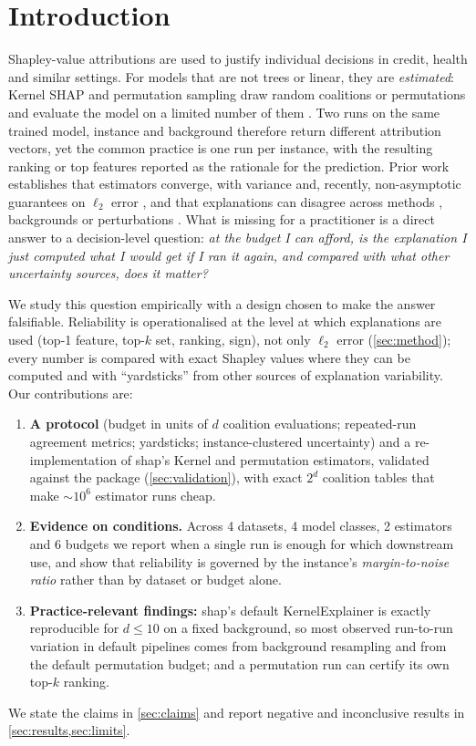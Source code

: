 \documentclass{article}
\begin{document}
\section{Introduction}
Shapley-value attributions \citep{shapley1953,lundberg2017} are used to justify individual decisions in credit, health and similar settings.
For models that are not trees or linear, they are \emph{estimated}: Kernel SHAP and permutation sampling draw random coalitions or permutations and evaluate the model on a limited number of them \citep{lundberg2017,mitchell2022,covert2021}.
Two runs on the same trained model, instance and background therefore return different attribution vectors, yet the common practice is one run per instance, with the resulting ranking or top features reported as the rationale for the prediction.
Prior work establishes that estimators converge, with variance and, recently, non-asymptotic guarantees on $\ell_2$ error \citep{covert2021,musco2024}, and that explanations can disagree across methods \citep{krishna2022}, backgrounds \citep{yuan2022} or perturbations \citep{alvarezmelis2018,ghorbani2019}.
What is missing for a practitioner is a direct answer to a decision-level question: \emph{at the budget I can afford, is the explanation I just computed what I would get if I ran it again, and compared with what other uncertainty sources, does it matter?}

We study this question empirically with a design chosen to make the answer falsifiable.
Reliability is operationalised at the level at which explanations are used (top-1 feature, top-$k$ set, ranking, sign), not only $\ell_2$ error (\cref{sec:method}); every number is compared with exact Shapley values where they can be computed and with ``yardsticks'' from other sources of explanation variability.
Our contributions are:
\begin{enumerate}
\item \textbf{A protocol} (budget in units of $d$ coalition evaluations; repeated-run agreement metrics; yardsticks; instance-clustered uncertainty) and a re-implementation of shap's Kernel and permutation estimators, validated against the package (\cref{sec:validation}), with exact $2^d$ coalition tables that make $\sim\!10^6$ estimator runs cheap.
\item \textbf{Evidence on conditions.} Across 4 datasets, 4 model classes, 2 estimators and 6 budgets we report when a single run is enough for which downstream use, and show that reliability is governed by the instance's \emph{margin-to-noise ratio} rather than by dataset or budget alone.
\item \textbf{Practice-relevant findings:} shap's default KernelExplainer is exactly reproducible for $d\le10$ on a fixed background, so most observed run-to-run variation in default pipelines comes from background resampling and from the default permutation budget; and a permutation run can certify its own top-$k$ ranking.
\end{enumerate}
We state the claims in \cref{sec:claims} and report negative and inconclusive results in \cref{sec:results,sec:limits}.
\end{document}
